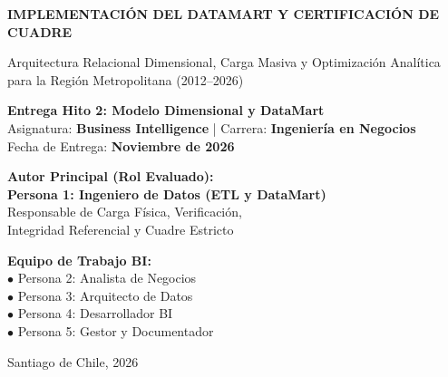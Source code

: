 \documentclass[11pt,a4paper]{article}
\begin{document}
\begin{titlepage}
    \centering
    \vspace*{1cm}
    {\Huge \bfseries \color{primaryblue} IMPLEMENTACIÓN DEL DATAMART Y CERTIFICACIÓN DE CUADRE\par}
    \vspace{0.4cm}
    {\LARGE \color{secondaryblue} Arquitectura Relacional Dimensional, Carga Masiva y Optimización Analítica para la Región Metropolitana (2012--2026)\par}
    \vspace{1cm}
    
    \begin{tcolorbox}[colback=lightbg, colframe=primaryblue, width=\textwidth, arc=3mm]
        \centering
        \large \textbf{Entrega Hito 2: Modelo Dimensional y DataMart}\\[2mm]
        \normalsize Asignatura: \textbf{Business Intelligence} | Carrera: \textbf{Ingeniería en Negocios}\\[1mm]
        Fecha de Entrega: \textbf{Noviembre de 2026}
    \end{tcolorbox}
    
    \vspace{2cm}
    \begin{minipage}{0.45\textwidth}
        \textbf{Autor Principal (Rol Evaluado):}\\
        \textbf{\color{primaryblue}Persona 1: Ingeniero de Datos (ETL y DataMart)}\\
        Responsable de Carga Física, Verificación,\\
        Integridad Referencial y Cuadre Estricto
    \end{minipage}
    \hfill
    \begin{minipage}{0.45\textwidth}
        \textbf{Equipo de Trabajo BI:}\\
        $\bullet$ Persona 2: Analista de Negocios\\
        $\bullet$ Persona 3: Arquitecto de Datos\\
        $\bullet$ Persona 4: Desarrollador BI\\
        $\bullet$ Persona 5: Gestor y Documentador
    \end{minipage}

    \vfill
    {\small \color{darkgray} Santiago de Chile, 2026}\par
\end{titlepage}
\end{document}
